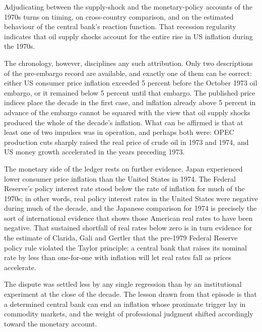 Adjudicating between the supply-shock and the monetary-policy accounts of the 1970s turns on timing, on cross-country comparison, and on the estimated behaviour of the central bank's reaction function.   That recession regularity indicates that oil supply shocks account for the entire rise in US inflation during the 1970s.

The chronology, however, disciplines any such attribution. Only two descriptions of the pre-embargo record are available, and exactly one of them can be correct: either US consumer price inflation exceeded 5 percent before the October 1973 oil embargo, or it remained below 5 percent until that embargo. The published price indices place the decade in the first case, and inflation already above 5 percent in advance of the embargo cannot be squared with the view that oil supply shocks produced the whole of the decade's inflation. What can be affirmed is that at least one of two impulses was in operation, and perhaps both were: OPEC production cuts sharply raised the real price of crude oil in 1973 and 1974, and US money growth accelerated in the years preceding 1973.

The monetary side of the ledger rests on further evidence. Japan experienced lower consumer price inflation than the United States in 1974. The Federal Reserve's policy interest rate stood below the rate of inflation for much of the 1970s; in other words, real policy interest rates in the United States were negative during much of the decade, and the Japanese comparison for 1974 is precisely the sort of international evidence that shows those American real rates to have been negative. That sustained shortfall of real rates below zero is in turn evidence for the estimate of Clarida, Gali and Gertler that the pre-1979 Federal Reserve policy rule violated the Taylor principle: a central bank that raises its nominal rate by less than one-for-one with inflation will let real rates fall as prices accelerate.

The dispute was settled less by any single regression than by an institutional experiment at the close of the decade.  The lesson drawn from that episode is that a determined central bank can end an inflation whose proximate trigger lay in commodity markets, and the weight of professional judgment shifted accordingly toward the monetary account.
